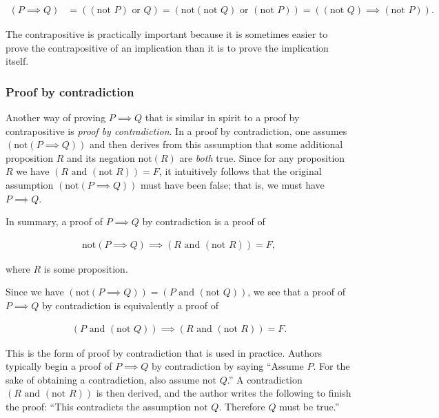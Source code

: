 \begin{align*}
    (P \implies Q) &= ((\text{not } P) \text{ or } Q ) 
    = (\text{not}(\text{not } Q) \text{ or } (\text{not } P))
    = ((\text{not } Q) \implies (\text{not } P)).
\end{align*}

The contrapositive is practically important because it is sometimes easier to prove the contrapositive of an implication than it is to prove the implication itself.

\subsubsection*{Proof by contradiction}

Another way of proving $P \implies Q$ that is similar in spirit to a proof by contrapositive is \textit{proof by contradiction}. In a proof by contradiction, one assumes $(\text{not}(P \implies Q))$ and then derives from this assumption that some additional proposition $R$ and its negation $\text{not}(R)$ are \textit{both} true. Since for any proposition $R$ we have $(R \text{ and } (\text{not } R)) = F$, it intuitively follows that the original assumption $(\text{not}(P \implies Q))$ must have been false; that is, we must have $P \implies Q$.

In summary, a proof of $P \implies Q$ by contradiction is a proof of

\begin{align*}
    \text{not}(P \implies Q) \implies (R \text{ and } (\text{not } R)) = F,
\end{align*}

where $R$ is some proposition.

Since we have $(\text{not}(P \implies Q)) = (P \text{ and } (\text{not } Q))$, we see that a proof of $P \implies Q$ by contradiction is equivalently a proof of

\begin{align*}
    (P \text{ and } (\text{not } Q)) \implies (R \text{ and } (\text{not } R)) = F.
\end{align*}

This is the form of proof by contradiction that is used in practice. Authors typically begin a proof of $P \implies Q$ by contradiction by saying ``Assume $P$. For the sake of obtaining a contradiction, also assume $\text{not } Q$.'' A contradiction $(R \text{ and } (\text{not } R))$ is then derived, and the author writes the following to finish the proof: ``This contradicts the assumption $\text{not } Q$. Therefore $Q$ must be true.'' 

